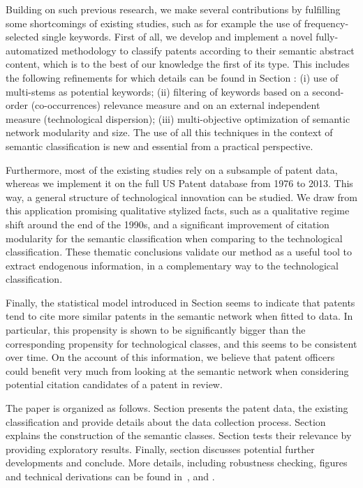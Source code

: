 Building on such previous research, we make several contributions by fulfilling some shortcomings of existing studies, such as for example the use of frequency-selected single keywords. First of all, we develop and implement a novel fully-automatized methodology to classify patents according to their semantic abstract content, which is to the best of our knowledge the first of its type. This includes the following refinements for which details can be found in Section : (i) use of multi-stems as potential keywords; (ii) filtering of keywords based on a second-order (co-occurrences) relevance measure and on an external independent measure (technological dispersion); (iii) multi-objective optimization of semantic network modularity and size. The use of all this techniques in the context of semantic classification is new and essential from a practical perspective. 

Furthermore, most of the existing studies rely on a subsample of patent data, whereas we implement it on the full US Patent database from 1976 to 2013. This way, a general structure of technological innovation can be studied. We draw from this application promising qualitative stylized facts, such as a qualitative regime shift around the end of the 1990s, and a significant improvement of citation modularity for the semantic classification when comparing to the technological classification. These thematic conclusions validate our method as a useful tool to extract endogenous information, in a complementary way to the technological classification.

Finally, the statistical model introduced in Section  seems to indicate that patents tend to cite more similar patents in the semantic network  when fitted to data. In particular, this propensity is shown to be significantly bigger than the corresponding propensity for technological classes, and this seems to be consistent over time. On the account of this information, we believe that patent officers could benefit very much from looking at the semantic network when considering potential citation candidates of a patent in review.

The paper is organized as follows. Section  presents the patent data, the existing classification and provide details about the data collection process. Section  explains the construction of the semantic classes. Section  tests their relevance by providing exploratory results. Finally, section  discusses potential further developments and conclude. More details, including robustness checking, figures and technical derivations can be found in~,  and .


